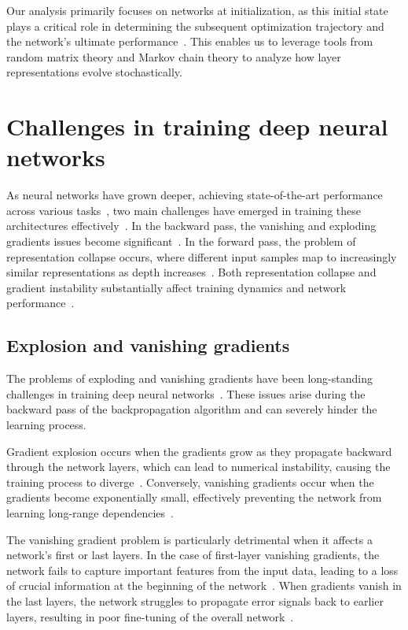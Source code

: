Our analysis primarily focuses on networks at initialization, as this initial state plays a critical role in determining the subsequent optimization trajectory and the network's ultimate performance~\cite{saxe2013exact, xiao2018dynamical, frankle2018lottery, pennington2017resurrecting}. This enables us to leverage tools from random matrix theory and Markov chain theory to analyze how layer representations evolve stochastically. 

\section{Challenges in training deep neural networks}

As neural networks have grown deeper, achieving state-of-the-art performance across various tasks~\cite{he2016deep, devlin2018bert}, two main challenges have emerged in training these architectures effectively~\cite{pascanu2013difficulty}. In the backward pass, the vanishing and exploding gradients issues become significant~\cite{bengio1994learning, pascanu2013difficulty,hanin2018neural}. In the forward pass, the problem of representation collapse occurs, where different input samples map to increasingly similar representations as depth increases~\cite{daneshmand2020batch,noci2022signal}. Both representation collapse and gradient instability substantially affect training dynamics and network performance~\cite{hanin2018neural}.


\subsection{Explosion and vanishing gradients}
The problems of exploding and vanishing gradients have been long-standing challenges in training deep neural networks~\cite{hochreiter1991untersuchungen, bengio1994learning}. These issues arise during the backward pass of the backpropagation algorithm and can severely hinder the learning process.

Gradient explosion occurs when the gradients grow as they propagate backward through the network layers, which can lead to numerical instability, causing the training process to diverge~\cite{pascanu2013difficulty}. Conversely, vanishing gradients occur when the gradients become exponentially small, effectively preventing the network from learning long-range dependencies~\cite{hochreiter1998vanishing}.

The vanishing gradient problem is particularly detrimental when it affects a network's first or last layers. In the case of first-layer vanishing gradients, the network fails to capture important features from the input data, leading to a loss of crucial information at the beginning of the network~\cite{glorot2010understanding}. When gradients vanish in the last layers, the network struggles to propagate error signals back to earlier layers, resulting in poor fine-tuning of the overall network~\cite{he2015delving}.

